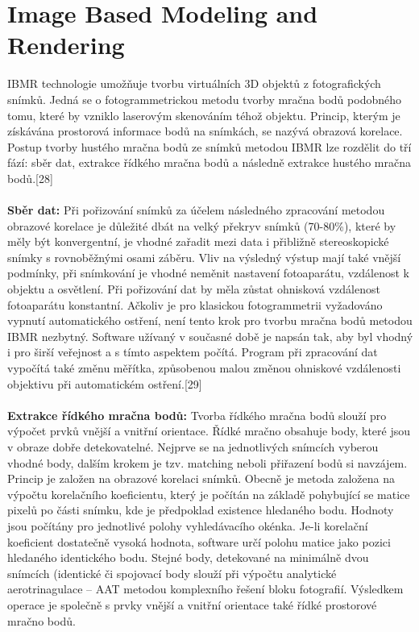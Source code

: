 \documentclass[a4paper, 12pt]{report}
\begin{document}
\chapter{Image Based Modeling and Rendering}
IBMR technologie umožňuje tvorbu virtuálních 3D objektů z fotografických snímků. Jedná se o fotogrammetrickou metodu tvorby mračna bodů podobného tomu, které by vzniklo laserovým skenováním téhož objektu. Princip, kterým je získávána prostorová informace bodů na snímkách, se nazývá obrazová korelace. Postup tvorby hustého mračna bodů ze snímků metodou IBMR lze rozdělit do tří fází: sběr dat, extrakce řídkého mračna bodů a následně extrakce hustého mračna bodů.[28]\\
\\
\textbf{Sběr dat:} Při pořizování snímků za účelem následného zpracování metodou obrazové korelace je důležité dbát na velký překryv snímků (70-80\%), které by měly být konvergentní, je vhodné zařadit mezi data i přibližně stereoskopické snímky s rovnoběžnými osami záběru. Vliv na výsledný výstup mají také vnější podmínky, při snímkování je vhodné neměnit nastavení fotoaparátu, vzdálenost k objektu a osvětlení. Při pořizování dat by měla zůstat ohnisková vzdálenost fotoaparátu konstantní. Ačkoliv je pro klasickou fotogrammetrii vyžadováno vypnutí automatického ostření, není tento krok pro tvorbu mračna bodů metodou IBMR nezbytný. Software užívaný v současné době je napsán tak, aby byl vhodný i pro širší veřejnost a s tímto aspektem počítá. Program při zpracování dat vypočítá také změnu měřítka, způsobenou malou změnou ohniskové vzdálenosti objektivu při automatickém ostření.[29]\\
\\
\textbf{Extrakce řídkého mračna bodů:} Tvorba řídkého mračna bodů slouží pro výpočet prvků vnější a vnitřní orientace. Řídké mračno obsahuje body, které jsou v obraze dobře detekovatelné. Nejprve se na jednotlivých snímcích vyberou vhodné body, dalším krokem je tzv. matching neboli přiřazení bodů si navzájem. Princip je založen na obrazové korelaci snímků. Obecně je metoda založena na výpočtu korelačního koeficientu, který je počítán na základě pohybující se matice pixelů po části snímku, kde je předpoklad existence hledaného bodu. Hodnoty jsou počítány pro jednotlivé polohy vyhledávacího okénka. Je-li korelační koeficient dostatečně vysoká hodnota, software určí polohu matice jako pozici hledaného identického bodu. Stejné body, detekované na minimálně dvou snímcích (identické či spojovací body slouží při výpočtu analytické aerotrinagulace – AAT metodou komplexního řešení bloku fotografií. Výsledkem operace je společně s prvky vnější a vnitřní orientace také řídké prostorové mračno bodů.\\
\end{document}
